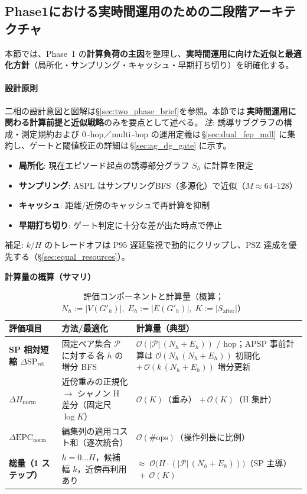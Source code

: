 \documentclass[ja=standard,xelatex]{bxjsarticle}
\begin{document}
\subsection{Phase1における実時間運用のための二段階アーキテクチャ}
\label{sec:ged_complexity}

本節では、Phase~1 の\textbf{計算負荷の主因}を整理し、\textbf{実時間運用に向けた近似と最適化方針}（局所化・サンプリング・キャッシュ・早期打ち切り）を明確化する。

\paragraph{設計原則}
二相の設計意図と図解は\S\ref{sec:two_phase_brief}を参照。本節では\,\textbf{実時間運用に関わる計算前提と近似戦略}のみを要点として述べる。\,\textit{注}: 誘導サブグラフの構成・測定規約および 0\,\mbox{-}hop／multi\,\mbox{-}hop の運用定義は\,\S\ref{sec:dual_fep_mdl} に集約し、ゲートと閾値校正の詳細は\,\S\ref{sec:ag_dg_gate} に示す。
\begin{itemize}[leftmargin=*]
  \item \textbf{局所化}: 現在エピソード起点の誘導部分グラフ $S_h$ に計算を限定
  \item \textbf{サンプリング}: ASPL はサンプリングBFS（多源化）で近似（$M\approx64$–$128$）
  \item \textbf{キャッシュ}: 距離/近傍のキャッシュで再計算を抑制
  \item \textbf{早期打ち切り}: ゲート判定に十分な差が出た時点で停止
\end{itemize}
\noindent 補足: $k/H$ のトレードオフは P95 遅延監視で動的にクリップし、PSZ 達成を優先する（\S\ref{sec:equal_resources}）。

\medskip
\noindent\textbf{計算量の概算（サマリ）}
\begin{table}[H]
\centering
\small
\caption{評価コンポーネントと計算量（概算；$N_h{:=}|V(G'_h)|,\;E_h{:=}|E(G'_h)|,\;K{:=}|S_{\mathrm{after}}|$）}
\label{tab:complexity_summary}
\begin{tabular}{@{}p{4.2cm}p{5.8cm}p{5.6cm}@{}}
\toprule
評価項目 & 方法/最適化 & 計算量（典型） \\
\midrule
\textbf{SP 相対短縮 $\Delta\mathrm{SP}_{\mathrm{rel}}$} & 固定ペア集合 $\mathcal{P}$ に対する\,各 $h$ の増分 BFS & $\mathcal{O}(|\mathcal{P}|\,(N_h{+}E_h))$ / hop；APSP 事前計算は $\mathcal{O}(N_h\,(N_h{+}E_h))$ 初期化 $+\,\mathcal{O}(k\,(N_h{+}E_h))$ 増分更新 \\
\textbf{$\Delta H_{\mathrm{norm}}$} & 近傍重みの正規化 $\to$ シャノン H 差分（固定尺 $\log K$） & $\mathcal{O}(K)$（重み） $+\,\mathcal{O}(K)$（H 集計） \\
\textbf{$\Delta\mathrm{EPC}_{\mathrm{norm}}$} & 編集列の適用コスト和（逐次統合） & $\mathcal{O}(\#\text{ops})$（操作列長に比例） \\
\textbf{総量（1 ステップ）} & $h{=}0\ldots H$，候補幅 $k$，近傍再利用あり & $\approx\;\mathcal{O}\!\big(H\cdot(|\mathcal{P}|\,(N_h{+}E_h))\big)$（SP 主導）$\,+\,\mathcal{O}(K)$ \\
\bottomrule
\end{tabular}
\end{table}
\end{document}
